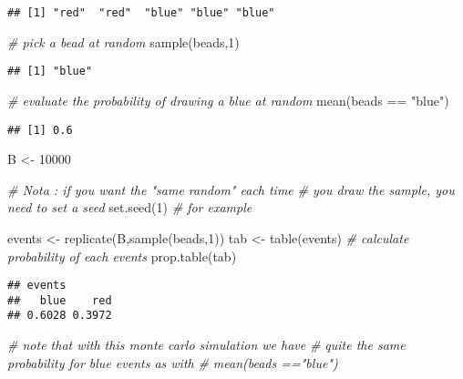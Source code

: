 \documentclass[
]{book}
\newenvironment{Shaded}{\begin{snugshade}}{\end{snugshade}}
\newcommand{\CommentTok}[1]{\textcolor[rgb]{0.56,0.35,0.01}{\textit{#1}}}
\newcommand{\DecValTok}[1]{\textcolor[rgb]{0.00,0.00,0.81}{#1}}
\newcommand{\FunctionTok}[1]{\textcolor[rgb]{0.00,0.00,0.00}{#1}}
\newcommand{\NormalTok}[1]{#1}
\newcommand{\OtherTok}[1]{\textcolor[rgb]{0.56,0.35,0.01}{#1}}
\newcommand{\SpecialCharTok}[1]{\textcolor[rgb]{0.00,0.00,0.00}{#1}}
\newcommand{\StringTok}[1]{\textcolor[rgb]{0.31,0.60,0.02}{#1}}
\begin{document}
\begin{verbatim}
## [1] "red"  "red"  "blue" "blue" "blue"
\end{verbatim}

\begin{Shaded}
\begin{Highlighting}[]
\CommentTok{\# pick a bead at random}
\FunctionTok{sample}\NormalTok{(beads,}\DecValTok{1}\NormalTok{)}
\end{Highlighting}
\end{Shaded}

\begin{verbatim}
## [1] "blue"
\end{verbatim}

\begin{Shaded}
\begin{Highlighting}[]
\CommentTok{\# evaluate the probability of drawing a blue at random}
\FunctionTok{mean}\NormalTok{(beads }\SpecialCharTok{==} \StringTok{"blue"}\NormalTok{)}
\end{Highlighting}
\end{Shaded}

\begin{verbatim}
## [1] 0.6
\end{verbatim}

\begin{Shaded}
\begin{Highlighting}[]
\NormalTok{B }\OtherTok{\textless{}{-}} \DecValTok{10000}

\CommentTok{\# Nota : if you want the "same random" each time }
\CommentTok{\# you draw the sample, you need to set a seed}
\FunctionTok{set.seed}\NormalTok{(}\DecValTok{1}\NormalTok{)}
\CommentTok{\# for example}



\NormalTok{events }\OtherTok{\textless{}{-}} \FunctionTok{replicate}\NormalTok{(B,}\FunctionTok{sample}\NormalTok{(beads,}\DecValTok{1}\NormalTok{))}
\NormalTok{tab }\OtherTok{\textless{}{-}} \FunctionTok{table}\NormalTok{(events)}
\CommentTok{\# calculate probability of each events}
\FunctionTok{prop.table}\NormalTok{(tab)}
\end{Highlighting}
\end{Shaded}

\begin{verbatim}
## events
##   blue    red 
## 0.6028 0.3972
\end{verbatim}

\begin{Shaded}
\begin{Highlighting}[]
\CommentTok{\# note that with this monte carlo simulation we have }
\CommentTok{\# quite the same probability for blue events as with}
\CommentTok{\# mean(beads =="blue")}
\end{Highlighting}
\end{Shaded}
\end{document}
